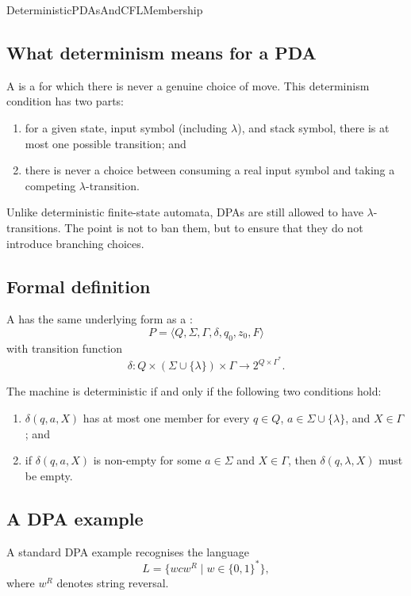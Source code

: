 \documentclass[hidelinks]{article}
\begin{document}
\begin{smodule}[title={Deterministic PDAs and CFL Membership}]{DeterministicPDAsAndCFLMembership}
\subsection{What determinism means for a PDA}

A  is a  for which there is never a genuine choice of move.
This determinism condition has two parts:
\begin{enumerate}
    \item for a given state, input symbol (including $\lambda$), and stack symbol, there is at most one possible transition; and
    \item there is never a choice between consuming a real input symbol and taking a competing $\lambda$-transition.
\end{enumerate}

Unlike deterministic finite-state automata, DPAs are still allowed to have $\lambda$-transitions.
The point is not to ban them, but to ensure that they do not introduce branching choices.

\subsection{Formal definition}

A  has the same underlying form as a :
\[
P = \langle Q, \Sigma, \Gamma, \delta, q_0, z_0, F \rangle
\]
with transition function
\[
\delta : Q \times (\Sigma \cup \{\lambda\}) \times \Gamma \to 2^{Q \times \Gamma^*}.
\]

The machine is deterministic if and only if the following two conditions hold:
\begin{enumerate}
    \item $\delta(q,a,X)$ has at most one member for every $q \in Q$, $a \in \Sigma \cup \{\lambda\}$, and $X \in \Gamma$; and
    \item if $\delta(q,a,X)$ is non-empty for some $a \in \Sigma$ and $X \in \Gamma$, then $\delta(q,\lambda,X)$ must be empty.
\end{enumerate}

\subsection{A DPA example}

A standard DPA example recognises the language
\[
L = \{wcw^R \mid w \in \{0,1\}^*\},
\]
where $w^R$ denotes string reversal.


\end{smodule}
\end{document}
